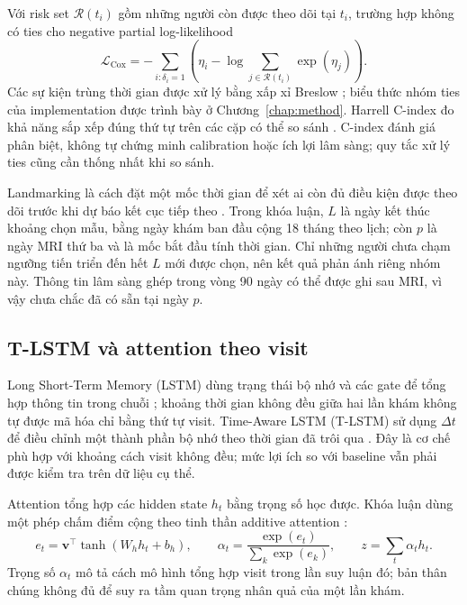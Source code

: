 Với risk set $\mathcal{R}(t_i)$ gồm những người còn được theo dõi tại $t_i$, trường hợp không có ties cho negative partial log-likelihood
\begin{equation}
\mathcal{L}_{\mathrm{Cox}}
=-\sum_{i:\delta_i=1}\left(\eta_i-\log\sum_{j\in\mathcal{R}(t_i)}\exp(\eta_j)\right).
\end{equation}
Các sự kiện trùng thời gian được xử lý bằng xấp xỉ Breslow \cite{breslow1974covariance}; biểu thức nhóm ties của implementation được trình bày ở Chương~\ref{chap:method}. Harrell C-index đo khả năng sắp xếp đúng thứ tự trên các cặp có thể so sánh \cite{harrell1996multivariable}. C-index đánh giá phân biệt, không tự chứng minh calibration hoặc ích lợi lâm sàng; quy tắc xử lý ties cũng cần thống nhất khi so sánh.

Landmarking là cách đặt một mốc thời gian để xét ai còn đủ điều kiện được theo dõi trước khi dự báo kết cục tiếp theo \cite{vanhouwelingen2007dynamic}. Trong khóa luận, $L$ là ngày kết thúc khoảng chọn mẫu, bằng ngày khám ban đầu cộng 18 tháng theo lịch; còn $p$ là ngày MRI thứ ba và là mốc bắt đầu tính thời gian. Chỉ những người chưa chạm ngưỡng tiến triển đến hết $L$ mới được chọn, nên kết quả phản ánh riêng nhóm này. Thông tin lâm sàng ghép trong vòng 90 ngày có thể được ghi sau MRI, vì vậy chưa chắc đã có sẵn tại ngày $p$.

\subsection{T-LSTM và attention theo visit}
Long Short-Term Memory (LSTM) dùng trạng thái bộ nhớ và các gate để tổng hợp thông tin trong chuỗi \cite{hochreiter1997lstm}; khoảng thời gian không đều giữa hai lần khám không tự được mã hóa chỉ bằng thứ tự visit. Time-Aware LSTM (T-LSTM) sử dụng $\Delta t$ để điều chỉnh một thành phần bộ nhớ theo thời gian đã trôi qua \cite{baytas2017patient}. Đây là cơ chế phù hợp với khoảng cách visit không đều; mức lợi ích so với baseline vẫn phải được kiểm tra trên dữ liệu cụ thể.

Attention tổng hợp các hidden state $h_t$ bằng trọng số học được. Khóa luận dùng một phép chấm điểm cộng theo tinh thần additive attention \cite{bahdanau2015attention}:
\begin{equation}
 e_t=\bm v^{\top}\tanh(W_h h_t+b_h),\qquad
 \alpha_t=\frac{\exp(e_t)}{\sum_k\exp(e_k)},\qquad
 z=\sum_t\alpha_t h_t.
\end{equation}
Trọng số $\alpha_t$ mô tả cách mô hình tổng hợp visit trong lần suy luận đó; bản thân chúng không đủ để suy ra tầm quan trọng nhân quả của một lần khám.

